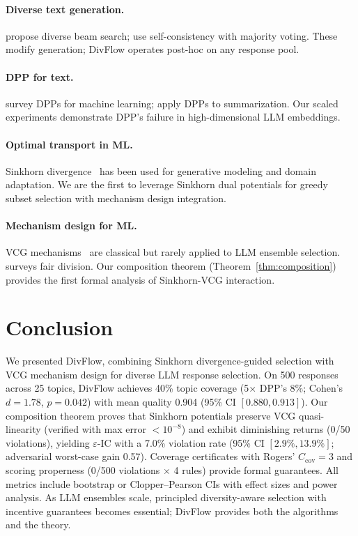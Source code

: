 \documentclass[10pt]{article}
\begin{document}
\paragraph{Diverse text generation.}
\citet{li2023diverse} propose diverse beam search; \citet{wang2023selfconsistency} use self-consistency with majority voting.
These modify generation; DivFlow operates post-hoc on any response pool.

\paragraph{DPP for text.}
\citet{kulesza2012determinantal} survey DPPs for machine learning; \citet{cho2019multi} apply DPPs to summarization.
Our scaled experiments demonstrate DPP's failure in high-dimensional LLM embeddings.

\paragraph{Optimal transport in ML.}
Sinkhorn divergence~\citep{cuturi2013sinkhorn, feydy2019interpolating} has been used for generative modeling and domain adaptation.
We are the first to leverage Sinkhorn dual potentials for greedy subset selection with mechanism design integration.

\paragraph{Mechanism design for ML.}
VCG mechanisms~\citep{vickrey1961counterspeculation, groves1973incentives} are classical but rarely applied to LLM ensemble selection.
\citet{procaccia2013cake} surveys fair division.
Our composition theorem (Theorem~\ref{thm:composition}) provides the first formal analysis of Sinkhorn-VCG interaction.

\section{Conclusion}
\label{sec:conclusion}

We presented DivFlow, combining Sinkhorn divergence-guided selection with VCG mechanism design for diverse LLM response selection.
On 500 responses across 25 topics, DivFlow achieves 40\% topic coverage (5$\times$ DPP's 8\%; Cohen's $d = 1.78$, $p = 0.042$) with mean quality 0.904 (95\% CI $[0.880, 0.913]$).
Our composition theorem proves that Sinkhorn potentials preserve VCG quasi-linearity (verified with max error $< 10^{-8}$) and exhibit diminishing returns (0/50 violations), yielding $\varepsilon$-IC with a 7.0\% violation rate (95\% CI $[2.9\%, 13.9\%]$; adversarial worst-case gain 0.57).
Coverage certificates with Rogers' $C_{\mathrm{cov}} = 3$ and scoring properness (0/500 violations $\times$ 4 rules) provide formal guarantees.
All metrics include bootstrap or Clopper--Pearson CIs with effect sizes and power analysis.
As LLM ensembles scale, principled diversity-aware selection with incentive guarantees becomes essential; DivFlow provides both the algorithms and the theory.
\end{document}
